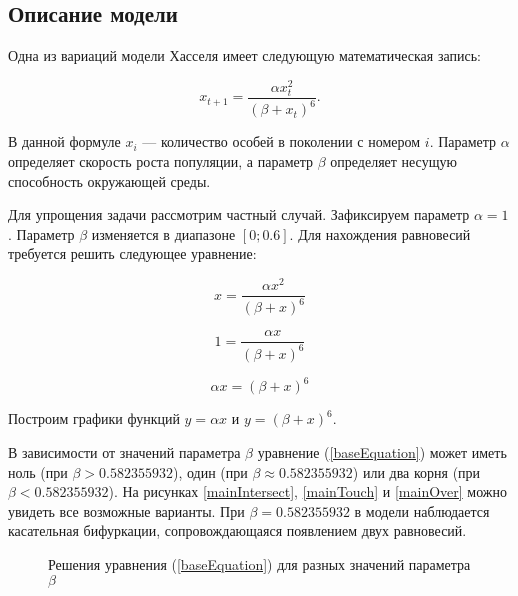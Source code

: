 \subsection{Описание модели}

    Одна из вариаций модели Хасселя \cite{densityDependenceInSingleSpeciesPopulations} имеет следующую математическая запись:

    \begin{equation}
        \label{origin}
        x_{t+1} = \frac{\alpha x_t^2}{(\beta + x_t)^6}.
    \end{equation}

    В данной формуле \(x_i\) --- количество особей в поколении с номером \(i\). Параметр \(\alpha\) определяет скорость роста популяции, а параметр \(\beta\) определяет несущую способность окружающей среды.
    
    Для упрощения задачи рассмотрим частный случай. Зафиксируем параметр \(\alpha = 1\). Параметр \(\beta\) изменяется в диапазоне \([0; 0.6]\). Для нахождения равновесий требуется решить следующее уравнение:  

    \[x = \frac{\alpha x^2}{(\beta + x)^6}\]
    
    \[1 = \frac{\alpha x}{(\beta + x)^6}\]

    \begin{equation}
        \label{baseEquation}
        \alpha x = (\beta + x)^6
    \end{equation}

    Построим графики функций \(y = \alpha x\) и \(y = (\beta + x)^6\). 
        
    В зависимости от значений параметра \(\beta\) уравнение (\ref{baseEquation}) может иметь ноль (при \(\beta > 0.582355932\)), один (при \(\beta \approx 0.582355932\)) или два корня (при \(\beta < 0.582355932\)). На рисунках \ref{mainIntersect}, \ref{mainTouch} и \ref{mainOver} можно увидеть все возможные варианты. При \(\beta=0.582355932\) в модели наблюдается касательная бифуркации, сопровождающаяся появлением двух равновесий.

    \begin{figure}
        \centering



        \captionsetup{justification=centering}
        \caption{Решения уравнения (\ref{baseEquation}) для разных значений параметра \(\beta\)}
    \end{figure}
